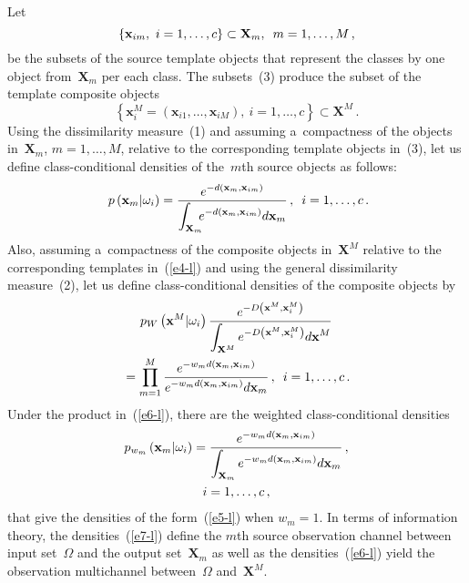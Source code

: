 \begin{multicols}{2}
Let
\begin{equation}
\left\{\mathbf{x}_{im},\ i=1,\ldots ,c \right\} \subset \mathbf{X}_m,\enskip 
m=1,\ldots ,M\,,
\label{e3-l}
\end{equation}
be the subsets of the source template objects that represent the classes by one 
object from~$\mathbf{X}_m$ per each class. The subsets~(3) produce the subset 
of the template composite objects 
\begin{equation}
\left\{ \mathbf{x}_i^M=\left( \mathbf{x}_{i1},\ldots , \mathbf{x}_{iM}\right),\ 
i=1,\ldots ,c\right\} \subset \mathbf{X}^M\,.
\label{e4-l}
\end{equation}
Using the dissimilarity measure~(1) and assuming a~compactness of the objects 
in~$\mathbf{X}_m$, $m=1,\ldots , M$, relative to the corresponding template 
objects in~(3), let us define class-conditional densities of the~$m$th source objects 
as follows:
\begin{equation}
p\left(\mathbf{x}_m\vert \omega_i\right) =\displaystyle\frac{\displaystyle e^{-d(\mathbf{x}_m, 
\mathbf{x}_{im})}\mathstrut}{\displaystyle \int\nolimits_{\mathbf{X}_m}\!\!\! e^{-d(\mathbf{x}_m, 
\mathbf{x}_{im})}d\mathbf{x}_m\mathstrut}\,,\enskip i=1, \ldots , c\,.\!\!
\label{e5-l}
\end{equation}
Also, assuming a~compactness of the composite objects in~$\mathbf{X}^M$ 
relative to the corresponding templates in~(\ref{e4-l}) and using the general 
dissimilarity measure~(2), let us define class-conditional densities of the composite 
objects by
\begin{multline}
p_W\left(\mathbf{x}^M\vert \omega_i\right) \displaystyle\frac{\displaystyle e^{-D\left(\mathbf{x}^M, 
\mathbf{x}_i^M\right)}\mathstrut}{\displaystyle \int\nolimits_{\mathbf{X}^M} e^{-D\left(\mathbf{x}^M, 
\mathbf{x}_i^M\right)} d\mathbf{x}^M\mathstrut}\\
{} = \prod\limits^M_{m=1} \displaystyle\frac{\displaystyle e^{-w_m 
d(\mathbf{x}_m, \mathbf{x}_{im})}\mathstrut}{\displaystyle e^{-w_m d(\mathbf{x}_m, 
\mathbf{x}_{im})} d\mathbf{x}_m\mathstrut}\,,\enskip i=1,\ldots , c\,.
\label{e6-l}
\end{multline}
Under the product in~(\ref{e6-l}), there are the weighted class-conditional 
densities 
\begin{multline}
p_{w_m}\left(\mathbf{x}_m\vert \omega_i\right) =\displaystyle\frac{\displaystyle e^{-w_m d(\mathbf{x}_m, 
\mathbf{x}_{im})}\mathstrut}{\displaystyle \int\nolimits_{\mathbf{X}_m} e^{-w_m d(\mathbf{x}_m, 
\mathbf{x}_{im})} d\mathbf{x}_m\mathstrut}\,,\\
 i=1,\ldots ,c\,,
\label{e7-l}
\end{multline}
that give the densities of the form~(\ref{e5-l}) when $w_m=1$. In terms of 
information theory,  the densities~(\ref{e7-l}) define the $m$th source observation 
channel between input set~$\Omega$ and the output set~$\mathbf{X}_m$ as well 
as the  densities~(\ref{e6-l}) yield the observation multichannel 
between~$\Omega$ and~$\mathbf{X}^M$.


\end{multicols}
